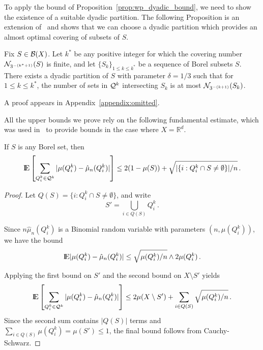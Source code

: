 \documentclass[sts]{imsart}
\newcommand{\RR}{\mathbb{R}}
\begin{document}
To apply the bound of Proposition~\ref{prop:wp_dyadic_bound}, we need to show the existence of a suitable dyadic partition.
The following Proposition is an extension of~\cite[Lemma~2.1]{BoiLeg14} and shows that we can choose a dyadic partition which provides an almost optimal covering of subsets of $S$.

\begin{proposition}\label{prop:covering_to_dyadic}
Fix $S \in \mathcal{B}(X)$.
Let $k^*$ be any positive integer for which the covering number $\mathcal{N}_{3^{-(k^*+1)}}(S)$ is finite, and let $\{S_k\}_{1 \leq k \leq k^*}$ be a sequence of Borel subsets $S$.
There exists a dyadic partition of $S$ with parameter $\delta = 1/3$ such that for $1 \leq k \leq k^*$, the number of sets in $\mathcal{Q}^k$ intersecting $S_k$ is at most $\mathcal{N}_{3^{-(k+1)}}(S_k)$.
\end{proposition}
A proof appears in Appendix~\ref{appendix:omitted}.

All the upper bounds we prove rely on the following fundamental estimate, which was used in~\cite{FouGui15} to provide bounds in the case where $X = \RR^d$.

\begin{proposition}\label{prop:expectation_estimate}
If $S$ is any Borel set, then
\begin{equation*}
{\rm I}\kern-0.18em{\rm E}\left[\sum_{Q_i^k \in \mathcal{Q}^k} |\mu(Q_i^k) - \hat \mu_n(Q_i^k)|\right] \leq 2 (1 - \mu(S)) + \sqrt{|\{i: Q_i^k \cap S \neq \emptyset\}|/n}\,.
\end{equation*}
\end{proposition}
\begin{proof}
Let $Q(S) = \{i: Q_i^k \cap S \neq \emptyset\}$, and write
\begin{equation*}
S' = \bigcup_{i \in Q(S)} Q_i^k\,.
\end{equation*}

Since $n \hat \mu_n(Q_i^k)$ is a Binomial random variable with parameters $(n, \mu(Q_i^k))$, we have the bound~\cite{BerKon13}
\begin{equation*}
{\rm I}\kern-0.18em{\rm E}|\mu(Q_i^k) - \hat \mu_n(Q_i^k)| \leq \sqrt{\mu(Q_i^k)/n} \wedge 2 \mu(Q_i^k)\,.
\end{equation*}

Applying the first bound on $S'$ and the second bound on $X \setminus S'$ yields
\begin{equation*}
{\rm I}\kern-0.18em{\rm E}\left[\sum_{Q_i^k \in \mathcal{Q}^k} |\mu(Q_i^k) - \hat \mu_n(Q_i^k)|\right] \leq 2 \mu(X \setminus S') + \sum_{i \in Q(S)} \sqrt{\mu(Q_i^k)/n}\,.
\end{equation*}
Since the second sum contains $|Q(S)|$ terms and $\sum_{i \in Q(S)} \mu(Q_i^k) = \mu(S') \leq 1$, the final bound follows from Cauchy-Schwarz.
\end{proof}
\end{document}
